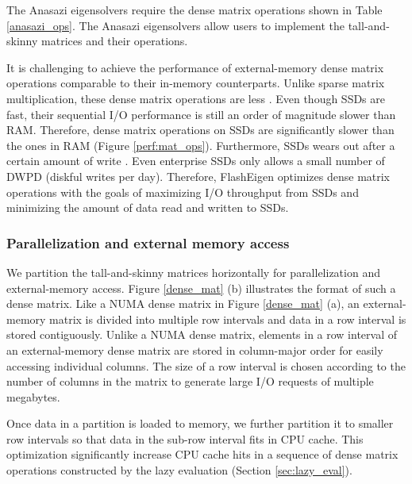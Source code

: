 The Anasazi eigensolvers require the dense matrix operations shown in Table
\ref{anasazi_ops}.
The Anasazi eigensolvers allow users to implement the tall-and-skinny matrices
and their operations.

It is challenging to achieve the performance of external-memory dense matrix
operations comparable to their in-memory counterparts. Unlike sparse matrix
multiplication, these dense matrix operations are less . Even though SSDs are fast, their sequential I/O performance is
still an order of magnitude slower than RAM. Therefore, dense matrix operations
on SSDs are significantly slower than the ones in RAM (Figure \ref{perf:mat_ops}).
Furthermore, SSDs wears out after a certain amount of write \cite{}.
Even enterprise SSDs \cite{} only allows a small number of DWPD
(diskful writes per day). Therefore, FlashEigen optimizes dense matrix operations
with the goals of maximizing I/O throughput from SSDs and minimizing the amount
of data read and written to SSDs.

%		

\subsubsection{Parallelization and external memory access}
We partition the tall-and-skinny matrices horizontally for parallelization
and external-memory access. Figure \ref{dense_mat} (b) illustrates the format
of such a dense matrix. Like a NUMA dense matrix in Figure \ref{dense_mat} (a),
an external-memory matrix is divided into multiple row intervals and data
in a row interval is stored contiguously. Unlike a NUMA dense matrix, elements
in a row interval of an external-memory dense matrix are stored in column-major order
for easily accessing individual columns. The size of a row interval is chosen
according to the number of columns in the matrix to generate large I/O requests
of multiple megabytes.

Once data in a partition is loaded to memory, we further partition it to
smaller row intervals so that data
in the sub-row interval fits in CPU cache.  This optimization significantly
increase CPU cache hits in a sequence of dense matrix operations constructed by
the lazy evaluation (Section \ref{sec:lazy_eval}).

